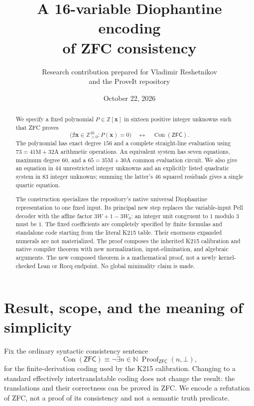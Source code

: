 \documentclass[11pt]{article}
\title{A 16-variable Diophantine encoding\\of ZFC consistency}
\author{Research contribution prepared for Vladimir Reshetnikov\\and the ProveIt repository}
\date{October 22, 2026}
\theoremstyle{remark}\newtheorem{remark}[theorem]{Remark}
\newcommand{\Z}{\mathbb Z}\newcommand{\N}{\mathbb N}\newcommand{\pos}{\mathbb Z_{>0}}
\newcommand{\Con}{\operatorname{Con}}\newcommand{\ZFC}{\mathsf{ZFC}}
\begin{document}
\maketitle
\begin{abstract}
We specify a fixed polynomial $P\in\Z[\mathbf x]$ in sixteen positive
integer unknowns such that ZFC proves
\[
 \bigl(\nexists\mathbf x\in\pos^{16}:P(\mathbf x)=0\bigr)
 \quad\longleftrightarrow\quad\Con(\ZFC).
\]
The polynomial has exact degree $156$ and a complete straight-line
evaluation using $73=41\mathrm M+32\mathrm A$ arithmetic operations.
An equivalent system has seven equations, maximum degree $60$, and a
$65=35\mathrm M+30\mathrm A$ common evaluation circuit. We also give
an equation in $44$ unrestricted integer unknowns and an explicitly
listed quadratic system in $83$ integer unknowns; summing the latter's
$46$ squared residuals gives a single quartic equation.

The construction specializes the repository's native universal
Diophantine representation to one fixed input. Its principal new step
replaces the variable-input Pell decoder with the affine factor
$3W+1-3W_0$: an integer unit congruent to $1$ modulo $3$ must be $1$.
The fixed coefficients are completely specified by finite formulas and
standalone code starting from the literal K215 table. Their enormous
expanded numerals are not materialized. The proof composes the inherited
K215 calibration and native compiler theorem with new normalization,
input-elimination, and algebraic arguments. The new composed theorem is
a mathematical proof, not a newly kernel-checked Lean or Rocq endpoint.
No global minimality claim is made.
\end{abstract}

\clearpage
\tableofcontents
\clearpage

\section{Result, scope, and the meaning of simplicity}
\label{sec:result}

Fix the ordinary syntactic consistency sentence
\[
 \Con(\ZFC)\equiv
 \neg\exists n\in\N\;\operatorname{Proof}_{\ZFC}(n,\bot),
\]
for the finite-derivation coding used by the K215 calibration. Changing
to a standard effectively intertranslatable coding does not change the
result: the translations and their correctness can be proved in ZFC.
We encode a refutation of ZFC, not a proof of its consistency and not
a semantic truth predicate.
\end{document}
